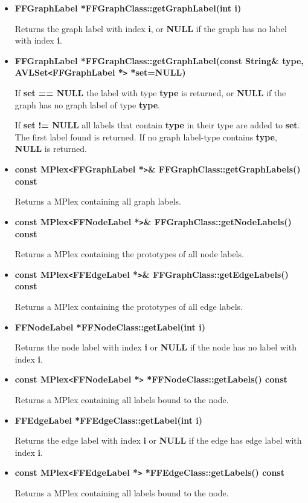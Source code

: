 \begin{itemize}

\item{\bf FFGraphLabel *FFGraphClass::getGraphLabel(int i)}
  
  Returns the graph label with index {\bf i}, or {\bf NULL} if
  the graph has no label with index {\bf i}.
  
\item{\bf FFGraphLabel *FFGraphClass::getGraphLabel(const
    String\& type, AVLSet\verb|<|FFGraphLabel *\verb|>|
    *set=NULL)}
  
  If {\bf set} {\bf == NULL} the label with type {\bf type} is
  returned, or {\bf NULL} if the graph has no graph label of type
  {\bf type}.
  
  If {\bf set} {\bf != NULL} all labels that contain {\bf type
    }in their type are added to {\bf set}. The first label found
  is returned. If no graph label-type contains {\bf type}, {\bf
    NULL} is returned.
  
\item{\bf const MPlex\verb|<|FFGraphLabel *\verb|>|\&
    FFGraphClass::getGraphLabels() const}
  
  Returns a MPlex containing all graph labels.
  
\item{\bf const MPlex\verb|<|FFNodeLabel *\verb|>|\&
    FFGraphClass::getNodeLabels() const}
  
  Returns a MPlex containing the prototypes of all node labels.
  
\item{\bf const MPlex\verb|<|FFEdgeLabel *\verb|>|\&
    FFGraphClass::getEdgeLabels() const}

  Returns a MPlex containing the prototypes of all edge labels.

\item{\bf FFNodeLabel *FFNodeClass::getLabel(int i)}
  
  Returns the node label with index {\bf i} or {\bf NULL} if the
  node has no label with index {\bf i}.

\item{\bf const MPlex\verb|<|FFNodeLabel *\verb|>|
*FFNodeClass::getLabels() const}

Returns a MPlex containing all labels bound to the node.

\item{\bf FFEdgeLabel *FFEdgeClass::getLabel(int i)}
  
  Returns the edge label with index {\bf i} or {\bf NULL} if the
  edge has edge label with index {\bf i}.

\item{\bf const MPlex\verb|<|FFEdgeLabel *\verb|>|
*FFEdgeClass::getLabels() const}

Returns a MPlex containing all labels bound to the node.

\end{itemize}

